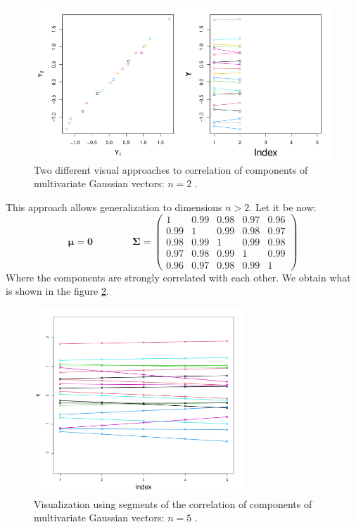 \begin{figure}[h]
    \centering
    \includegraphics[width=\textwidth]{images/Gaussiane/CorrelazioneMultidimensionale.png}
    \caption{Two different visual approaches to correlation of components of multivariate Gaussian vectors: $n=2$ \cite{wilkinson_introduction_2020}.}
    \label{correlazione4}
\end{figure}


\newpage 

This approach allows generalization to dimensions $n>2$. Let it be now:
\[\bm{\mu}=\bm{0} \qquad\qquad \bm{\Sigma}=\begin{pmatrix}1&0.99&0.98&0.97&0.96\\0.99&1&0.99&0.98&0.97\\0.98&0.99&1&0.99&0.98\\0.97&0.98&0.99&1&0.99\\0.96&0.97&0.98&0.99&1 \end{pmatrix}
\]
Where the components are strongly correlated with each other. We obtain what is shown in the figure \ref{correlazione5}.

\begin{figure}[h]
    \centering
    \includegraphics[width=0.7\textwidth]{images/Gaussiane/CorrelazioneMultidimensionale2.png}
    \caption{Visualization using segments of the correlation of components of multivariate Gaussian vectors: $n=5$ \cite{wilkinson_introduction_2020}.}
    \label{correlazione5}
\end{figure}

